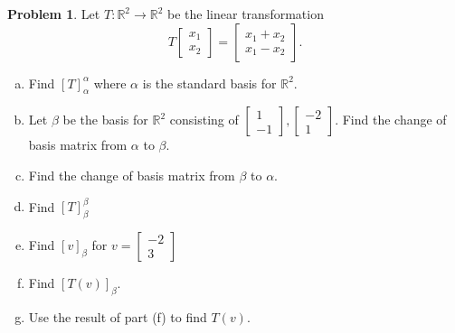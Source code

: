 \documentclass[10pt]{article}
\theoremstyle{definition}
\newtheorem{problem}[theorem]{Problem}
\newcommand{\1}[1]{\textbf{1}_{\left[#1\right]}} %
\def\R{\mathbb{R}} %
\begin{document}
\begin{problem}
  Let $T: \R^{2}\to \R^{2}$ be the linear transformation
  \begin{equation*}
    T
    \begin{bmatrix}
      x_{1}\\x_{2}
    \end{bmatrix}
    =
    \begin{bmatrix}
      x_{1}+x_{2}\\
      x_{1}-x_{2}
    \end{bmatrix}.
  \end{equation*}
  \begin{enumerate}[(a)]
    \setlength{\itemsep}{0pt}
    \item Find $[T]_{\alpha}^{\alpha}$ where $\alpha$ is the standard basis
    for $\R^{2}$.
    \item Let $\beta$ be the basis for $\R^{2}$ consisting of $
    \begin{bmatrix}
      1\\-1
    \end{bmatrix},
    \begin{bmatrix}
      -2\\1
    \end{bmatrix}$. Find the change of basis matrix from $\alpha$ to $\beta$.
    \item Find the change of basis matrix from $\beta$ to $\alpha$. 
    \item Find $[T]_{\beta}^{\beta} $
    \item Find $[v]_{\beta}$ for $v=
    \begin{bmatrix}
      -2\\3
    \end{bmatrix}
    $
    \item Find $[T(v)]_{\beta}$.
    \item Use the result of part (f) to find $T(v)$.
  \end{enumerate}
\end{problem}
\end{document}
